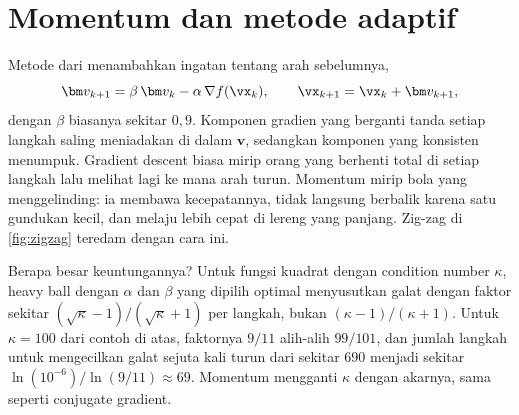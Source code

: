 \section{Momentum dan metode adaptif}

Metode  dari \citet{polyak1964} menambahkan ingatan tentang arah sebelumnya,
\begin{equation}
\bm v_{k+1}=\beta\,\bm v_k-\alpha\,\nabla f(\vx_k),\qquad \vx_{k+1}=\vx_k+\bm v_{k+1},
\end{equation}
dengan $\beta$ biasanya sekitar $0{,}9$. Komponen gradien yang berganti tanda setiap langkah saling
meniadakan di dalam $\bm v$, sedangkan komponen yang konsisten menumpuk. Gradient descent biasa
mirip orang yang berhenti total di setiap langkah lalu melihat lagi ke mana arah turun. Momentum
mirip bola yang menggelinding: ia membawa kecepatannya, tidak langsung berbalik karena satu
gundukan kecil, dan melaju lebih cepat di lereng yang panjang. Zig-zag di \cref{fig:zigzag}
teredam dengan cara ini.

Berapa besar keuntungannya? Untuk fungsi kuadrat dengan condition number $\kappa$, heavy ball dengan $\alpha$ dan $\beta$
yang dipilih optimal menyusutkan galat dengan faktor sekitar $(\sqrt\kappa-1)/(\sqrt\kappa+1)$ per langkah, bukan
$(\kappa-1)/(\kappa+1)$. Untuk $\kappa=100$ dari contoh di atas, faktornya $9/11$ alih-alih $99/101$, dan jumlah langkah
untuk mengecilkan galat sejuta kali turun dari sekitar 690 menjadi sekitar $\ln(10^{-6})/\ln(9/11)\approx69$. Momentum
mengganti $\kappa$ dengan akarnya, sama seperti conjugate gradient.

